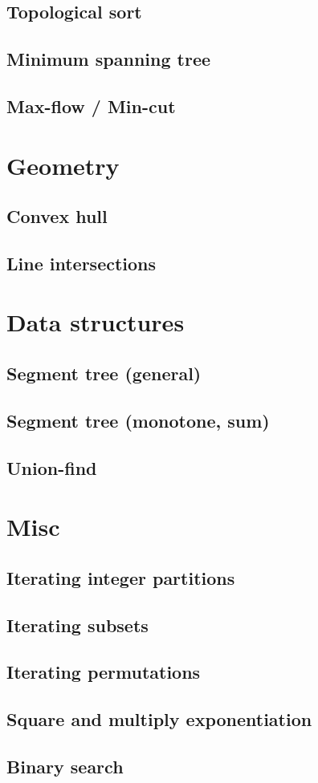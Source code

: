 \documentclass[a4paper,10pt]{article}
\begin{document}
\subsection{Topological sort}
\subsection{Minimum spanning tree}
\subsection{Max-flow / Min-cut}


\section{Geometry}
\subsection{Convex hull}
\subsection{Line intersections}
\section{Data structures}
\subsection{Segment tree (general)}
%
\subsection{Segment tree (monotone, sum)}

\subsection{Union-find}

\section{Misc}
\subsection{Iterating integer partitions}
\subsection{Iterating subsets}

\subsection{Iterating permutations}

\subsection{Square and multiply exponentiation}
\subsection{Binary search}
\end{document}
